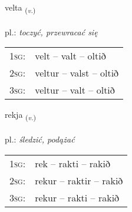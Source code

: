 \documentclass[frontgrid, backgrid]{flacards}\usepackage[]{graphicx}\usepackage[]{xcolor}
\begin{document}
\renewcommand{\flhead}{\vskip5pt \fboxsep=0pt {\small\bfseries\footnotesize Sagnorð | czasownik}}
\renewcommand{\fcfoot}{\vskip5pt \fboxsep=0pt \hspace{2pt}{\small\bfseries\footnotesize 1K}}

\renewcommand{\blhead}{\vskip5pt {\small\bfseries\footnotesize Sagnorð | czasownik }}
\renewcommand{\bcfoot}{\vskip5pt \hspace{2pt}{\small\bfseries\footnotesize 1K}}


{velta \small{\textsubscript{(\textit{v.})}} \\[1ex] %
\textphonetic{[vɛl̥ta]} \\
pl.: \emph{toczyć, przewracać się} \\  [2ex]
\renewcommand*{\arraystretch}{0.8}
\begin{tabular}{p{1cm}l}
\textsc{1sg}: & velt -- valt -- oltið \\ 
\textsc{2sg}: & veltur -- valst -- oltið \\ 
\textsc{3sg}: & veltur -- valt -- oltið \\ 
\end{tabular}
}

\renewcommand{\flhead}{\vskip5pt \fboxsep=0pt {\small\bfseries\footnotesize Sagnorð | czasownik}}
\renewcommand{\fcfoot}{\vskip5pt \fboxsep=0pt \hspace{2pt}{\small\bfseries\footnotesize 1K}}

\renewcommand{\blhead}{\vskip5pt {\small\bfseries\footnotesize Sagnorð | czasownik }}
\renewcommand{\bcfoot}{\vskip5pt \hspace{2pt}{\small\bfseries\footnotesize 1K}}


{rekja \small{\textsubscript{(\textit{v.})}} \\[1ex] %
\textphonetic{[rɛːca]} \\
pl.: \emph{śledzić, podążać} \\  [2ex]
\renewcommand*{\arraystretch}{0.8}
\begin{tabular}{p{1cm}l}
\textsc{1sg}: & rek -- rakti -- rakið \\ 
\textsc{2sg}: & rekur -- raktir -- rakið \\ 
\textsc{3sg}: & rekur -- rakti -- rakið \\ 
\end{tabular}
}
\end{document}
